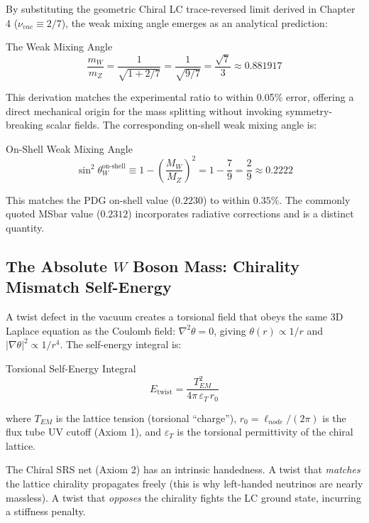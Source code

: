 By substituting the geometric Chiral LC trace-reversed limit derived in Chapter 4 ($\nu_{vac} \equiv 2/7$), the weak mixing angle emerges as an analytical prediction:

\begin{resultbox}{The Weak Mixing Angle}
\begin{equation}
\frac{m_W}{m_Z} = \frac{1}{\sqrt{1+2/7}} = \frac{1}{\sqrt{9/7}} = \frac{\sqrt{7}}{3} \approx 0.881917
\end{equation}
\end{resultbox}

This derivation matches the experimental ratio to within 0.05\% error, offering a direct mechanical origin for the mass splitting without invoking symmetry-breaking scalar fields. The corresponding on-shell weak mixing angle is:
\begin{resultbox}{On-Shell Weak Mixing Angle}
\begin{equation}
    \sin^2\theta_W^{\text{on-shell}} \equiv 1 - \left(\frac{M_W}{M_Z}\right)^2 = 1 - \frac{7}{9} = \frac{2}{9} \approx 0.2222
\end{equation}
\end{resultbox}
This matches the PDG on-shell value ($0.2230$) to within $0.35\%$. The commonly quoted MSbar value ($0.2312$) incorporates radiative corrections and is a distinct quantity.

\subsection{The Absolute $W$ Boson Mass: Chirality Mismatch Self-Energy}

A twist defect in the vacuum creates a torsional field that obeys the same 3D Laplace equation as the Coulomb field: $\nabla^2\theta = 0$, giving $\theta(r) \propto 1/r$ and $|\nabla\theta|^2 \propto 1/r^4$. The self-energy integral is:
\begin{resultbox}{Torsional Self-Energy Integral}
\begin{equation}
    E_{\text{twist}} = \frac{T_{EM}^2}{4\pi\,\varepsilon_T\, r_0}
\end{equation}
\end{resultbox}
where $T_{EM}$ is the lattice tension (torsional ``charge''), $r_0 = \ell_{node}/(2\pi)$ is the flux tube UV cutoff (Axiom 1), and $\varepsilon_T$ is the torsional permittivity of the chiral lattice.

The Chiral SRS net (Axiom 2) has an intrinsic handedness. A twist that \emph{matches} the lattice chirality propagates freely (this is why left-handed neutrinos are nearly massless). A twist that \emph{opposes} the chirality fights the LC ground state, incurring a stiffness penalty.

